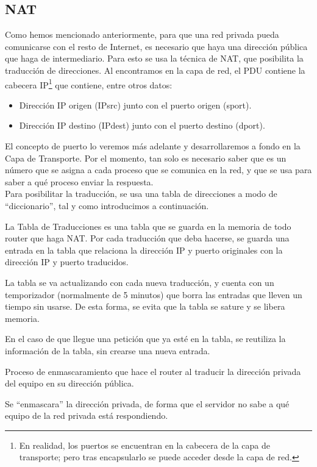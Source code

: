 \subsection{\acrfull{NAT}}

Como hemos mencionado anteriormente, para que una red privada pueda comunicarse con el resto de Internet, es necesario que haya una dirección pública que haga de intermediario. Para esto se usa la técnica de \acrshort{NAT}, que posibilita la traducción de direcciones.
Al encontramos en la capa de red, el \acrshort{PDU} contiene la cabecera IP\footnote{En realidad, los puertos se encuentran en la cabecera de la capa de transporte; pero tras encapsularlo se puede acceder desde la capa de red.} que contiene, entre otros datos:
\begin{itemize}
    \item Dirección IP origen ({IPsrc}) junto con el puerto origen ({sport}).
    \item Dirección IP destino ({IPdest}) junto con el puerto destino ({dport}).
\end{itemize}

El concepto de puerto lo veremos más adelante y desarrollaremos a fondo en la Capa de Transporte. Por el momento, tan solo es necesario saber que es un número que se asigna a cada proceso que se comunica en la red, y que se usa para saber a qué proceso enviar la respuesta.\\

Para posibilitar la traducción, se usa una tabla de direcciones a modo de ``diccionario'', tal y como introducimos a continuación.
\begin{definicion}
    La Tabla de Traducciones es una tabla que se guarda en la memoria de todo router que haga \acrshort{NAT}.
    Por cada traducción que deba hacerse, se guarda una entrada en la tabla que relaciona la dirección IP y puerto originales con la dirección IP y puerto traducidos.

    La tabla se va actualizando con cada nueva traducción, y cuenta con un temporizador (normalmente de 5 minutos) que borra las entradas que lleven un tiempo sin usarse. De esta forma, se evita que la tabla se sature y se libera memoria.

    En el caso de que llegue una petición que ya esté en la tabla, se reutiliza la información de la tabla, sin crearse una nueva entrada.
\end{definicion}

\begin{definicion}
    Proceso de enmascaramiento que hace el router al traducir la dirección privada del equipo en su dirección pública.

    Se ``enmascara'' la dirección privada, de forma que el servidor no sabe a qué equipo de la red privada está respondiendo.
\end{definicion}

